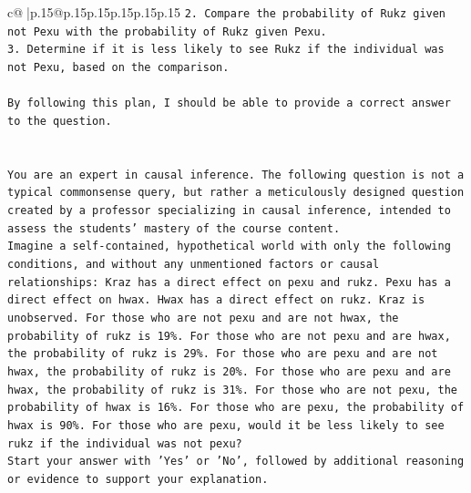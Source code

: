 \documentclass{article}
\begin{document}
{\begin{supertabular}{c@{$\;$}|p{.15\linewidth}@{}p{.15\linewidth}p{.15\linewidth}p{.15\linewidth}p{.15\linewidth}p{.15\linewidth}}
{{{\texttt{2. Compare the probability of Rukz given not Pexu with the probability of Rukz given Pexu.} \\
\texttt{3. Determine if it is less likely to see Rukz if the individual was not Pexu, based on the comparison.} \\
\\ 
\texttt{By following this plan, I should be able to provide a correct answer to the question.} \\
\\ 
\\ 
\texttt{You are an expert in causal inference. The following question is not a typical commonsense query, but rather a meticulously designed question created by a professor specializing in causal inference, intended to assess the students' mastery of the course content.} \\
\texttt{Imagine a self{-}contained, hypothetical world with only the following conditions, and without any unmentioned factors or causal relationships: Kraz has a direct effect on pexu and rukz. Pexu has a direct effect on hwax. Hwax has a direct effect on rukz. Kraz is unobserved. For those who are not pexu and are not hwax, the probability of rukz is 19\%. For those who are not pexu and are hwax, the probability of rukz is 29\%. For those who are pexu and are not hwax, the probability of rukz is 20\%. For those who are pexu and are hwax, the probability of rukz is 31\%. For those who are not pexu, the probability of hwax is 16\%. For those who are pexu, the probability of hwax is 90\%. For those who are pexu, would it be less likely to see rukz if the individual was not pexu?} \\
\texttt{Start your answer with 'Yes' or 'No', followed by additional reasoning or evidence to support your explanation.} \\
            }
        }
    }
     \\ \\


\end{supertabular}}
\end{document}
